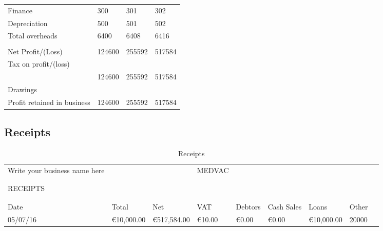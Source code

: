 \documentclass{article}
\begin{document}
\begin{table}[H]
\begin{tabular}{llll}
Finance                       & 300    & 301    & 302    \\
Depreciation                  & 500    & 501    & 502    \\
Total overheads               & 6400   & 6408   & 6416   \\
                              &        &        &        \\
Net Profit/(Loss)             & 124600 & 255592 & 517584 \\
Tax on profit/(loss)          &        &        &        \\
                              & 124600 & 255592 & 517584 \\
Drawings                      &        &        &        \\
Profit retained in business   & 124600 & 255592 & 517584
\end{tabular}
\end{table}

\pagebreak




\subsection{Receipts}
\begin{table}[H]
\centering
\caption{Receipts}
\label{my-label}
\begin{tabular}{lllllllll}
Write your business name here &               &            & MEDVAC      &        &         &            &            &       \\
                              &               &            &             &        &         &            &            &       \\
                              &               &            &             &        &         &            &            &       \\
RECEIPTS                      &               &            &             &        &         &            &            &       \\
                              &               &            &             &        &         &            &            &       \\
                              &               &            &             &        &         &            &            &       \\
Date & Total  & Net & VAT & Debtors & Cash Sales & Loans      & Other \\
05/07/16 & €10,000.00 & €517,584.00 & €10.00 & €0.00 & €0.00 & €10,000.00 & 20000
\end{tabular}
\end{table}
\end{document}
